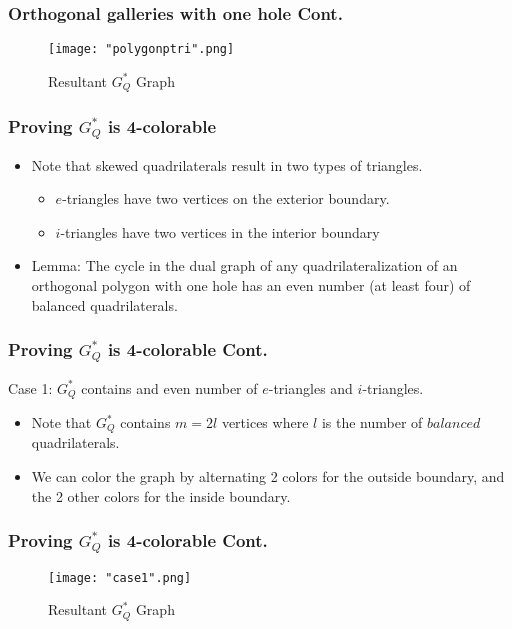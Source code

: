 \documentclass{beamer}
\begin{document}
\begin{frame}
\frametitle{Orthogonal galleries with one hole Cont.}
	\begin{center}
	\begin{figure}[H]
	\caption{Resultant $G^{*}_Q$ Graph}
	\centering
	\texttt{[image: "polygonptri".png]}
	\end{figure}
	\end{center}
\end{frame}



\begin{frame}
\frametitle{Proving $G^{*}_Q$ is 4-colorable}
\begin{itemize}
	\item Note that skewed quadrilaterals result in two types of triangles.
		\begin{itemize}
			\item $e$-triangles have two vertices on the exterior boundary.
			\item $i$-triangles have two vertices in the interior boundary 
		\end{itemize}
		\vfill
	\item Lemma: The cycle in the dual graph of any quadrilateralization of an orthogonal polygon with one hole has an even number (at least four) of balanced quadrilaterals.
\end{itemize}
\end{frame}

\begin{frame}
\frametitle{Proving $G^{*}_Q$ is 4-colorable Cont.}
Case 1: $G^{*}_Q$ contains and even number of $e$-triangles and $i$-triangles.  
\begin{itemize}
	\item Note that $G^{*}_Q$ contains $m = 2l$ vertices where $l$ is the number of $balanced$ quadrilaterals.
	\item We can color the graph by alternating 2 colors for the outside boundary, and the 2 other colors for the inside boundary. 
\end{itemize}
\end{frame}

\begin{frame}
\frametitle{Proving $G^{*}_Q$ is 4-colorable Cont.}
	\begin{center}
	\begin{figure}[H]
	\caption{Resultant $G^{*}_Q$ Graph}
	\centering
	\texttt{[image: "case1".png]}
	\end{figure}
	\end{center}
\end{frame}
\end{document}

